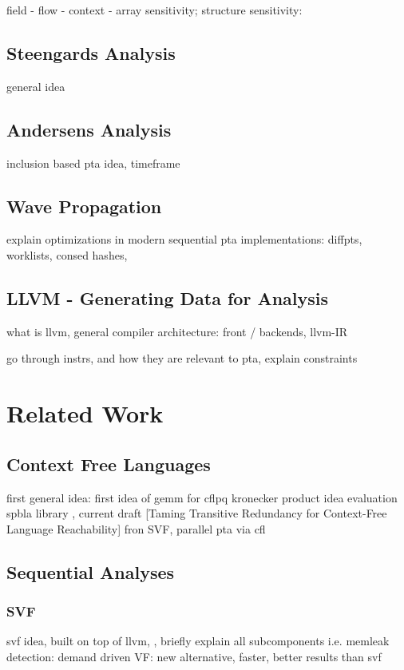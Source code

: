 field - flow - context - array sensitivity; structure sensitivity: \cite{balatsouras2016structure}
\subsection{Steengards Analysis}
general idea
\subsection{Andersens Analysis}
inclusion based pta idea, timeframe
\subsection{Wave Propagation}
explain optimizations in modern sequential pta implementations: diffpts, worklists, consed hashes, \cite{waveprop}
\subsection{LLVM - Generating Data for Analysis}
what is llvm, general compiler architecture: front / backends, llvm-IR

go through instrs, and how they are relevant to pta, explain constraints \cite{lin2015alias}
\section{Related Work}
\subsection{Context Free Languages}
first general idea: \cite{reps1998program} first idea of gemm for cflpq \cite{azimov2018context} kronecker product idea \cite{orachev2020context} evaluation \cite{mishin2019evaluation} spbla library \cite{orachev2021spbla}, current draft [Taming Transitive Redundancy for Context-Free Language Reachability] fron SVF, parallel pta via cfl \cite{su2014parallel}
\subsection{Sequential Analyses}
\subsubsection{SVF}
svf idea, built on top of llvm, \cite{sui2016svf}, briefly explain all subcomponents i.e. memleak detection: \cite{sui2014detecting} demand driven VF: \cite{sui2018value} new alternative, faster, better results than svf \cite{shi2018pinpoint}
